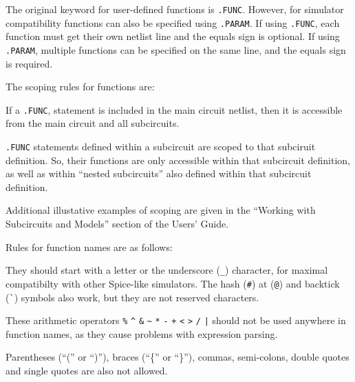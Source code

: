 \begin{Command}
The original keyword for user-defined functions is \texttt{.FUNC}.  However, 
for simulator compatibility functions can also be specified using \texttt{.PARAM}.
If using \texttt{.FUNC}, each function must get their own netlist line and the equals sign is optional.  
If using \texttt{.PARAM}, multiple functions can be specified on the same line, and the equals sign is required.

The scoping rules for functions are:
\begin{XyceItemize}
\item If a \texttt{.FUNC}, statement is included in the main circuit 
netlist, then it is accessible from the main circuit and all subcircuits. 
\item \texttt{.FUNC} statements defined within a subcircuit are scoped 
to that subciruit definition.  So, their functions are only accessible within 
that subcircuit definition, as well as within ``nested subcircuits'' also 
defined within that subcircuit definition.
\end{XyceItemize}

Additional illustative examples of scoping are given in the
``Working with Subcircuits and Models'' section of the \Xyce{} Users'
Guide\UsersGuide.

Rules for function names are as follows:
\begin{XyceItemize}
\item They should start with a letter or the underscore (\verb|_|) character,
for maximal compatibilty with other Spice-like simulators.  The hash (\verb|#|)
at (\verb|@|) and backtick (\verb|`|) symbols also work, but they are not
reserved characters.
\item These arithmetic operators \verb|%| \verb|^| \verb|&| \verb|~|
\verb|*| \verb|-| \verb|+| \verb|<| \verb|>| \verb|/| \verb+|+ should not
be used anywhere in function names, as they cause problems with expression
parsing.
\item Parentheses (``('' or ``)''), braces (``\{'' or ``\}''), commas,
semi-colons, double quotes and single quotes are also not allowed.
\end{XyceItemize}

\end{Command}

